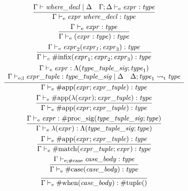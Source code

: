 \begin{gather*}
    \infer{\Gamma \vdash_\mathrm{e} \mathit{expr}\; \mathit{where\_decl}: \mathit{type}}{
        \Gamma \vdash \mathit{where\_decl} \mid \Delta
        &
        \Gamma; \Delta \vdash_\mathrm{e} \mathit{expr}: \mathit{type}
    }
    \\
    \infer{\Gamma \vdash_\mathrm{e} (\mathit{expr}: \mathit{type}): \mathit{type}}{
        \Gamma \vdash_\mathrm{e} \mathit{expr}: \mathit{type}
    }
    \\
    \infer{\Gamma \vdash_\mathrm{e} \mathrm{\#infix}(\mathit{expr}_1; \mathit{expr}_2; \mathit{expr}_3): \mathit{type}}{
        \Gamma \vdash_\mathrm{e} \mathit{expr}_2(\mathit{expr_1}; \mathit{expr}_3): \mathit{type}
    }
    \\
    \infer{\Gamma \vdash_\mathrm{e} \mathrm{\#app}(\mathit{expr}; \mathit{expr\_tuple}): \mathit{type}}{
        \begin{array}{c}
            \Gamma \vdash_\mathrm{e} \mathit{expr}: \Lambda(\mathit{type\_tuple\_sig}; \mathit{type}_1)
            \\
            \Gamma \vdash_{\mathrm{e}; \mathrm{l}} \mathit{expr\_tuple}: \mathit{type\_tuple\_sig} \mid \Delta
            \hspace{1em}
            \Delta; \mathit{type}_1 \rightsquigarrow_\mathrm{t} \mathit{type}
        \end{array}
    }
    \\
    \infer{\Gamma \vdash_\mathrm{e} \mathrm{\#app}(\mathit{expr}; \mathit{expr\_tuple}): \mathit{type}}{
        \Gamma \vdash_\mathrm{e} \mathrm{\#app}(\lambda(\mathit{expr}); \mathit{expr\_tuple}): \mathit{type}
    }
    \\
    \infer{\Gamma \vdash_\mathrm{e} \lambda(\mathit{expr}): \Lambda(\mathit{type\_tuple\_sig}; \mathit{type})}{
        \Gamma \vdash_\mathrm{e} \mathit{expr}: \mathrm{\#proc\_sig}(\mathit{type\_tuple\_sig}; \mathit{type})
    }
    \\
    \infer{\Gamma \vdash_\mathrm{e} \mathrm{\#match}(\mathit{expr\_tuple}; \mathit{expr}): \mathit{type}}{
        \Gamma \vdash_\mathrm{e} \mathrm{\#app}(\mathit{expr}; \mathit{expr\_tuple}): \mathit{type}
    }
    \\
    \infer{\Gamma \vdash_\mathrm{e} \mathrm{\#case}(\mathit{case\_body}): \mathit{type}}{
        \Gamma \vdash_{\mathrm{e}; \mathrm{\#case}} \mathit{case\_body}: \mathit{type}
    }
    \\
    \infer{\Gamma \vdash_\mathrm{e} \mathrm{\#when}(\mathit{case\_body}): \mathrm{\#tuple}()}{
}
\end{gather*}
